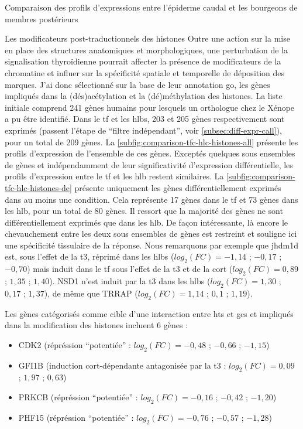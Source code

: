 \documentclass[../main.tex]{subfiles}
\begin{document}
\begin{chapter}{Comparaison des profils d'expressions entre l'épiderme caudal et les bourgeons de membres postérieurs}
\begin{section}{Les modificateurs post-traductionnels des histones}
Outre une action sur la mise en place des structures anatomiques et morphologiques, une perturbation de la signalisation thyroïdienne pourrait affecter la présence de modificateurs de la chromatine et influer sur la spécificité spatiale et temporelle de déposition des marques.
J'ai donc sélectionné sur la base de leur annotation \gls{go}, les gènes impliqués dans la (dés)acétylation et la (dé)méthylation des histones.
La liste initiale comprend 241 gènes humains pour lesquels un orthologue chez le Xénope a pu être identifié.
Dans le \gls{tf} et les \glspl{hlb}, 203 et 205 gènes respectivement sont exprimés (passent l'étape de ``filtre indépendant'', voir \autoref{subsec:diff-expr-call}), pour un total de 209 gènes.
La \autoref{subfig:comparison-tfc-hlc-histones-all} présente les profils d'expression de l'ensemble de ces gènes.
Exceptés quelques sous ensembles de gènes et indépendamment de leur significativité d'expression différentielle, les profils d'expression entre le \gls{tf} et les \gls{hlb} restent similaires.
La \autoref{subfig:comparison-tfc-hlc-histones-de} présente uniquement les gènes différentiellement exprimés dans au moins une condition.
Cela représente 17 gènes dans le \gls{tf} et 73 gènes dans les \gls{hlb}, pour un total de 80 gènes.
Il ressort que la majorité des gènes ne sont différentiellement exprimés que dans les \gls{hlb}.
De façon intéressante, là encore le chevauchement entre les deux sous ensembles de gènes est restreint et souligne ici une spécificité tissulaire de la réponse.
Nous remarquons par exemple que \gls{jhdm1d} est, sous l'effet de la \gls{t3}, réprimé dans les \glspl{hlb} ($log_2(FC)=-1,14$ ; $-0,17$ ; $-0,70$) mais induit dans le \gls{tf} sous l'effet de la \gls{t3} et de la \gls{cort} ($log_2(FC)=0,89$ ; $1,35$ ; $1,40$).
NSD1 n'est induit par la \gls{t3} dans les \glspl{hlb} ($log_2(FC)=1,30$ ; $0,17$ ; $1,37$), de même que TRRAP ($log_2(FC)=1,14$ ; $0,1$ ; $1,19$).
\par
Les gènes catégorisés comme cible d'une interaction entre \glspl{ht} et \glspl{gc} et impliqués dans la modification des histones incluent 6 gènes :
\begin{itemize}
\item CDK2 (répréssion ``potentiée'' : $log_2(FC)=-0,48$ ; $-0,66$ ; $-1,15$)
\item GFI1B (induction \gls{cort}-dépendante antagonisée par la \gls{t3} : $log_2(FC)=0,09$ ; $1,97$ ; $0,63$)
\item PRKCB (répréssion ``potentiée'' : $log_2(FC)=-0,16$ ; $-0,42$ ; $-1,20$)
\item PHF15 (répréssion ``potentiée'' : $log_2(FC)=-0,76$ ; $-0,57$ ; $-1,28$)

\end{itemize}
\end{section}
\end{chapter}
\end{document}
